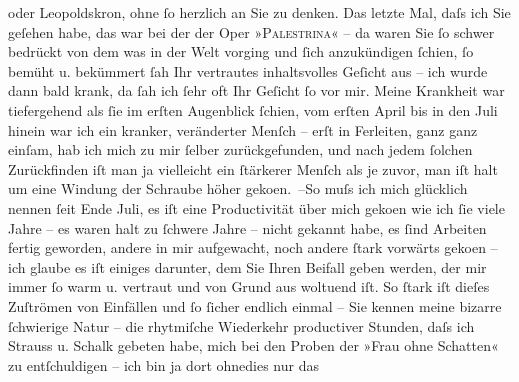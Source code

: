 \begin{ledgroupsized}[t]{13cm}
               oder Leopoldskron, ohne ſo herzlich an Sie zu
               denken.\pend
           \pstart
           Das letzte Mal, daſs ich Sie geſehen habe, das war bei der \label{K_L02326_1v}\label{K_L02326_1h} der Oper »\textsc{Palestrina}« – da waren Sie ſo schwer bedrückt von dem was in der Welt vorging und ſich
               anzukündigen ſchien, ſo bemüht u. bekümmert ſah Ihr vertrautes inhaltsvolles Geſicht
               aus – ich wurde dann bald krank, da ſah ich ſehr oft Ihr Geſicht ſo vor mir. Meine
               Krankheit war tiefergehend als ſie im erſten Augenblick ſchien, vom erſten
                  April bis in den Juli hinein war ich ein kranker, veränderter
               Menſch – erſt in Ferleiten, ganz ganz einſam, hab
               ich mich zu mir ſelber {\pb}zurückgefunden, und nach jedem ſolchen Zurückfinden iſt man ja vielleicht ein
               ſtärkerer Menſch als je zuvor, man iſt halt um eine Windung der Schraube höher geko{\geminationm}en. –\hspace*{1.5em}So muſs ich mich
               glücklich nennen ſeit Ende Juli, es iſt eine Productivität über mich
                  geko{\geminationm}en wie ich ſie viele Jahre – es waren halt zu
               ſchwere Jahre – nicht gekannt habe, es ſind Arbeiten fertig geworden, andere in mir
               aufgewacht, noch andere ſtark vorwärts geko{\geminationm}en – ich
               glaube es iſt einiges darunter, dem Sie Ihren Beifall geben werden, der mir immer ſo
               warm u. vertraut und von Grund aus woltuend iſt.\pend
           \pstart
           So ſtark iſt dieſes Zuſtrömen von Einfällen und ſo ſicher endlich einmal – Sie kennen
               meine bizarre ſchwierige Natur – die rhytmiſche Wiederkehr productiver Stunden, daſs
               ich Strauss u. Schalk gebeten habe, mich bei den Proben der »Frau ohne Schatten« zu entſchuldigen – ich bin ja dort ohnedies nur das

\end{ledgroupsized}
